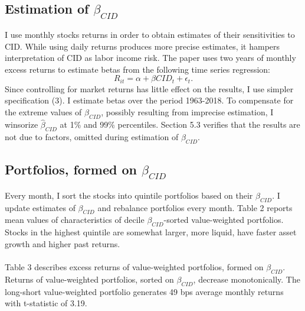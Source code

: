 \documentclass[12pt]{article}
\begin{document}
\subsection{Estimation of $\beta_{CID}$}
I use monthly stocks returns in order to obtain estimates of their sensitivities to CID. While using daily returns produces more precise estimates, it hampers interpretation of CID as labor income risk. The paper uses two years of monthly excess returns to estimate betas from the following time series regression:
\begin{equation}
R_{it}=\alpha+\beta CID_t + \epsilon_t.
\end{equation}
Since controlling for market returns has little effect on the results, I use simpler specification (3). I estimate betas over the period 1963-2018. To compensate for the extreme values of $\hat{\beta}_{CID}$, possibly resulting from imprecise estimation, I winsorize $\hat{\beta}_{CID}$ at 1\% and 99\% percentiles. Section 5.3 verifies that the results are not due to factors, omitted during estimation of $\beta_{CID}$.  

\subsection{Portfolios, formed on $\beta_{CID}$}

Every month, I sort the stocks into quintile portfolios based on their $\beta_{CID}$. I update estimates of $\beta_{CID}$ and rebalance portfolios every month. 
Table 2 reports mean values of characteristics of decile $\beta_{CID}$-sorted value-weighted portfolios. Stocks in the highest quintile are somewhat larger, more liquid, have faster asset growth and higher past returns. 
\paragraph{}
Table 3 describes excess returns of value-weighted portfolios, formed on $\beta_{CID}$. Returns of value-weighted portfolios, sorted on $\beta_{CID}$, decrease monotonically. The long-short value-weighted portfolio generates 49 bps average monthly returns with t-statistic of 3.19. 
\end{document}
